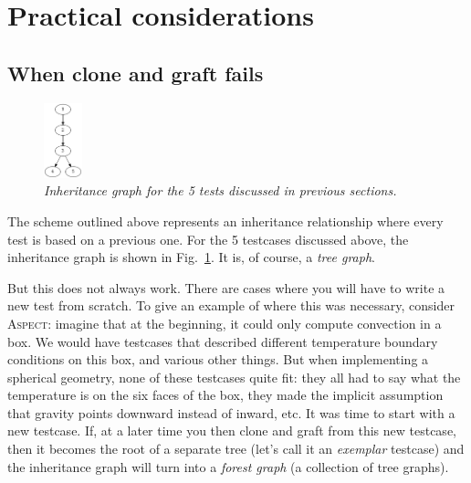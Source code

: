 \documentclass{article}
\newcommand{\aspect}{\textsc{Aspect}}
\begin{document}
\section{Practical considerations}

\subsection{When clone and graft fails}

\begin{figure}
  \begin{center}
    \vspace*{-24pt}
    \includegraphics[width=0.1\textwidth]{figures/inheritance.png}
    \vspace*{-12pt}
  \end{center}
  \caption{\it Inheritance graph for the 5 tests discussed in previous sections.}
  \vspace*{-3mm}
  \label{fig:inheritance}
\end{figure}
The scheme outlined above represents an inheritance relationship where every
test is based on a previous one. For the 5 testcases discussed above, the
inheritance graph is shown in Fig.~\ref{fig:inheritance}. It is, of course, a
\textit{tree graph}.

But this does not always work. There are cases where you will have to write a
new test from scratch. To give an example of where this was necessary,
consider \aspect{}: imagine that at the beginning, it could only compute
convection in a box. We would have testcases that described different
temperature boundary conditions on this box, and various other things. But
when implementing a spherical geometry, none of these testcases quite fit:
they all had to say what the temperature is on the six faces of the box, they
made the implicit assumption that gravity points downward instead of inward,
etc. It was time to start with a new testcase. If, at a later time you then
clone and graft from this new testcase, then it becomes the root of a separate
tree (let's call it an \textit{exemplar} testcase) and the inheritance graph
will turn into a \textit{forest graph} (a collection of tree graphs).
\end{document}
